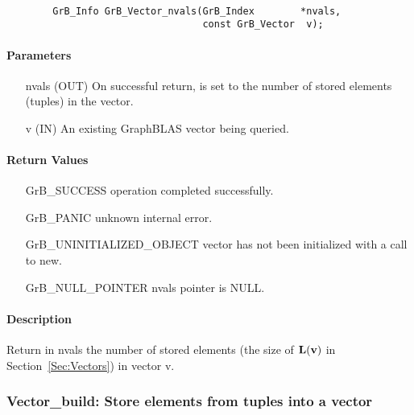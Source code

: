 \paragraph{\syntax}

\begin{verbatim}
        GrB_Info GrB_Vector_nvals(GrB_Index        *nvals,
                                  const GrB_Vector  v);
\end{verbatim}

\paragraph{Parameters}

\begin{itemize}[leftmargin=1.1in]
    \item[{\sf nvals}] ({\sf OUT}) On successful return, is set to the number of 
                                   stored elements (tuples) in the vector.
    \item[{\sf v}]     ({\sf IN})  An existing GraphBLAS vector being queried.
\end{itemize}


\paragraph{Return Values}

\begin{itemize}[leftmargin=2.1in]
\item[{\sf GrB\_SUCCESS}]   operation completed successfully.
\item[{\sf GrB\_PANIC}]     unknown internal error.
\item[{\sf GrB\_UNINITIALIZED\_OBJECT}]  vector has not been initialized with a call to {\sf new}.
\item[{\sf GrB\_NULL\_POINTER}]    {\sf nvals} pointer is {\sf NULL}.
\end{itemize}

\paragraph{Description}

Return in {\sf nvals} the number of stored elements (the size of $\bold{L}({\bf v})$
in Section~\ref{Sec:Vectors}) in vector {\sf v}.


\subsubsection{{\sf Vector\_build}: Store elements from tuples into a vector}
\label{Sec:Vector_build}

